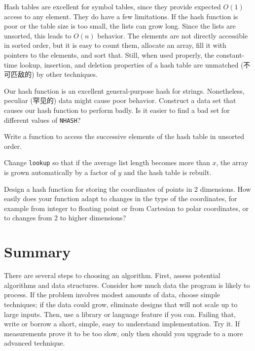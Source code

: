 Hash tables are excellent for symbol tables, since they provide expected
$O(1)$ access to any element. They do have a few limitations. If the hash
function is poor or the table size is too small, the lists can grow long.
Since the lists are unsorted, this leads to $O(n)$ behavior. The elements
are not directly accessible in sorted order, but it is easy to count them,
allocate an array, fill it with pointers to the elements, and sort that.
Still, when used properly, the constant-time lookup, insertion, and
deletion properties of a hash table are unmatched (不可匹敌的) by other
techniques. 

\begin{exercise}
Our hash function is an excellent general-purpose hash for strings.
Nonetheless, peculiar (罕见的) data might cause poor behavior. Construct a
data set that causes our hash function to perform badly. Is it easier to
find a bad set for different values of \verb'NHASH'?
\end{exercise}

\begin{exercise}
Write a function to access the successive elements of the hash table in
unsorted order.
\end{exercise}

\begin{exercise}
Change \verb'lookup' so that if the average list length becomes more than
$x$, the array is grown automatically by a factor of $y$ and the hash table
is rebuilt.
\end{exercise}

\begin{exercise}
Design a hash function for storing the coordinates of points in 2
dimensions. How easily does your function adapt to changes in the type of
the coordinates, for example from integer to floating point or from
Cartesian to polar coordinates, or to changes from 2 to higher dimensions?
\end{exercise}

\section{Summary}

There are several steps to choosing an algorithm. First, assess potential
algorithms and data structures. Consider how much data the program is
likely to process. If the problem involves modest amounts of data, choose
simple techniques; if the data could grow, eliminate designs that will not
scale up to large inputs. Then, use a library or language feature if you
can. Failing that, write or borrow a short, simple, easy to understand
implementation. Try it. If measurements prove it to be too slow, only then
should you upgrade to a more advanced technique.

